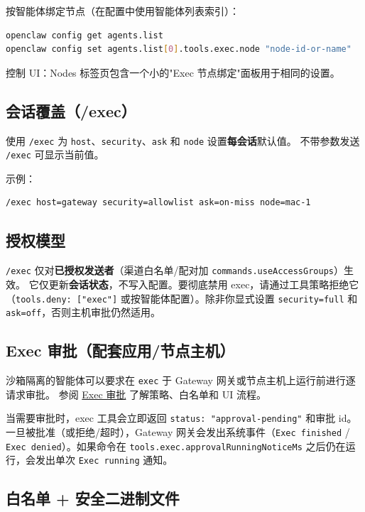 按智能体绑定节点（在配置中使用智能体列表索引）：

\begin{lstlisting}[language=bash]
openclaw config get agents.list
openclaw config set agents.list[0].tools.exec.node "node-id-or-name"
\end{lstlisting}


控制 UI：Nodes 标签页包含一个小的"Exec 节点绑定"面板用于相同的设置。

\subsection{会话覆盖（/exec）}


使用 \texttt{/exec} 为 \texttt{host}、\texttt{security}、\texttt{ask} 和 \texttt{node} 设置\textbf{每会话}默认值。
不带参数发送 \texttt{/exec} 可显示当前值。

示例：

\begin{lstlisting}
/exec host=gateway security=allowlist ask=on-miss node=mac-1
\end{lstlisting}


\subsection{授权模型}


\texttt{/exec} 仅对\textbf{已授权发送者}（渠道白名单/配对加 \texttt{commands.useAccessGroups}）生效。
它仅更新\textbf{会话状态}，不写入配置。要彻底禁用 exec，请通过工具策略拒绝它（\texttt{tools.deny: ["exec"]} 或按智能体配置）。除非你显式设置 \texttt{security=full} 和 \texttt{ask=off}，否则主机审批仍然适用。

\subsection{Exec 审批（配套应用/节点主机）}


沙箱隔离的智能体可以要求在 \texttt{exec} 于 Gateway 网关或节点主机上运行前进行逐请求审批。
参阅 \href{/tools/exec-approvals}{Exec 审批} 了解策略、白名单和 UI 流程。

当需要审批时，exec 工具会立即返回 \texttt{status: "approval-pending"} 和审批 id。一旦被批准（或拒绝/超时），Gateway 网关会发出系统事件（\texttt{Exec finished} / \texttt{Exec denied}）。如果命令在 \texttt{tools.exec.approvalRunningNoticeMs} 之后仍在运行，会发出单次 \texttt{Exec running} 通知。

\subsection{白名单 + 安全二进制文件}


